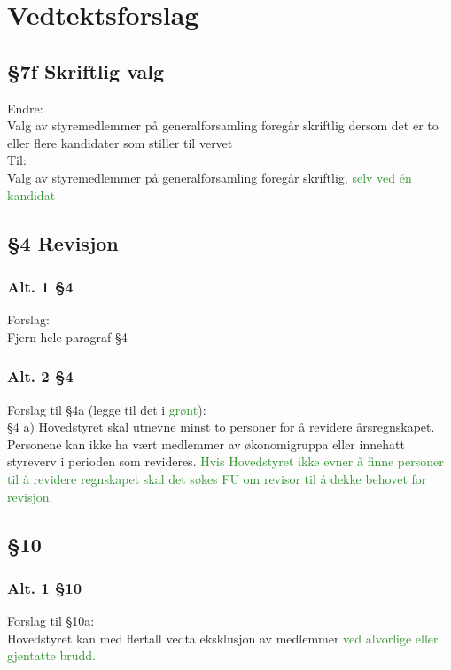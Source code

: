 \documentclass[10pt,norsk,a4paper,usenames,dvipsnames]{article}
\begin{document}
    \newpage

\section{Vedtektsforslag}

    \subsection{§7f Skriftlig valg}
    
        Endre:
        \\Valg av styremedlemmer på generalforsamling foregår skriftlig dersom det er to eller flere kandidater som stiller til vervet
        \\Til:
        \\Valg av styremedlemmer på generalforsamling foregår skriftlig, \textcolor{ForestGreen}{selv ved én kandidat}


    \subsection{§4 Revisjon}
        
        \subsubsection{Alt. 1 §4} 
            Forslag:
            \\Fjern hele paragraf §4
        \label{sec:revisjon-no-full}
        
        \subsubsection{Alt. 2 §4} 
            Forslag til §4a (legge til det i \textcolor{ForestGreen}{grønt}):
            \\§4 a)   Hovedstyret skal utnevne minst to personer for å revidere årsregnskapet. Personene kan ikke ha vært medlemmer av økonomigruppa eller innehatt styreverv i perioden som revideres. \textcolor{ForestGreen}{Hvis Hovedstyret ikke evner å finne personer til å revidere regnskapet skal det søkes FU om revisor til å dekke behovet for revisjon.}
        \label{sec:revisjon-full}
        

    \subsection{§10}
        
        \subsubsection{Alt. 1 §10} 
            Forslag til §10a:
            \\Hovedstyret kan med  flertall vedta eksklusjon av medlemmer \textcolor{ForestGreen}{ved alvorlige eller gjentatte brudd.}
        \label{sec:10-no-full}
        
\end{document}
